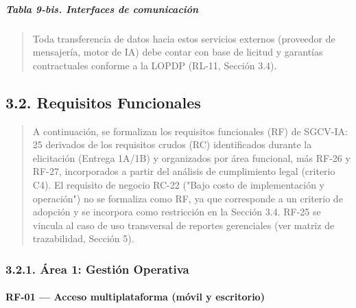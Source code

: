 \documentclass[
]{article}
\begin{document}
\subparagraph{Tabla 9-bis. Interfaces de
comunicación}\label{tabla-9-bis-interfaces-de-comunicacion}

\begin{quote}
Toda transferencia de datos hacia estos servicios externos (proveedor
de mensajería, motor de IA) debe contar con base de licitud y
garantías contractuales conforme a la LOPDP (RL-11, Sección 3.4).
\end{quote}

\subsection{3.2. Requisitos Funcionales}\label{requisitos-funcionales}

\begin{quote}
A continuación, se formalizan los requisitos funcionales (RF) de
SGCV-IA: 25 derivados de los requisitos crudos (RC) identificados durante
la elicitación (Entrega 1A/1B) y organizados por área funcional, más
RF-26 y RF-27, incorporados a partir del análisis de cumplimiento legal
(criterio C4). El requisito de negocio
RC-22 ("Bajo costo de implementación y operación") no se formaliza como
RF, ya que corresponde a un criterio de adopción y se incorpora como
restricción en la Sección 3.4. RF-25 se vincula al caso de uso
transversal de reportes gerenciales (ver matriz de trazabilidad,
Sección 5).
\end{quote}

\subsubsection{3.2.1. Área 1: Gestión Operativa}\label{uxe1rea-1-gestiuxf3n-operativa}

\paragraph{RF-01 --- Acceso multiplataforma (móvil y escritorio)}\label{rf-01-acceso-multiplataforma-m-vil-y-escritori}
\end{document}
